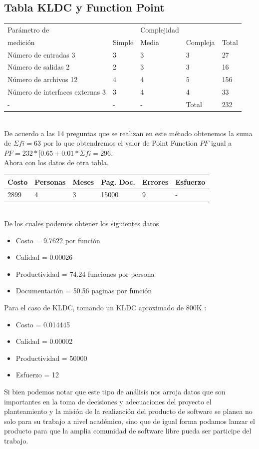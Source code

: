 \documentclass[10pt,executivepaper]{article}
\begin{document}
\subsection{Tabla KLDC y Function Point}
\begin{tabular}{|p{3cm}|p{2cm}|p{2cm}|p{2cm}|p{2cm}|}
\hline
Parámetro de & & Complejidad & & \\
medición & Simple & Media & Compleja & Total \\\hline
Número de entradas 3 & 3 & 3 & 3 & 27\\\hline
Número de salidas 2 & 2 & 3 & 3 & 16 \\\hline
Número de archivos 12 & 4 & 4 & 5 & 156 \\\hline
Número de interfaces externas 3 & 3 & 4 & 4 & 33\\\hline
- & - & - & Total & 232 \\\hline
\end{tabular}
\vspace{0.5cm}\\
De acuerdo a las 14 preguntas que se realizan en este método obtenemos la suma de $\Sigma{fi}=63$ por lo que obtendremos el valor de Point Function $PF$ igual a $PF=232*[0.65+0.01*\Sigma{fi}=296$.\\
Ahora con los datos de otra tabla.\vspace{0.5cm}\\
\begin{tabular}{|p{1.83cm}|p{1.83cm}|p{1.83cm}|p{1.83cm}|p{1.83cm}|p{1.83cm}|}
    \hline
    Costo & Personas & Meses & Pag. Doc. & Errores & Esfuerzo \\\hline
    2899 & 4 & 3 & 15000 & 9 & - \\\hline
\end{tabular}
\vspace{0.5cm}\\
De los cuales podemos obtener los siguientes datos
\begin{itemize}
    \item Costo = 9.7622 por función
    \item Calidad = 0.00026
    \item Productividad = 74.24 funciones por persona
    \item Documentación = 50.56 paginas por función
\end{itemize}
\vspace{0.5cm}
Para el caso de KLDC, tomando un KLDC aproximado de 800K :\vspace{0.5cm}
\begin{itemize}
    \item Costo = 0.014445
    \item Calidad = 0.00002
    \item Productividad = 50000
    \item Esfuerzo = 12
\end{itemize}
\vspace{0.5cm}
Si bien podemos notar que este tipo de análisis nos arroja datos que son importantes en la toma de decisiones y adecuaciones del proyecto el planteamiento y la misión de la realización del producto de software se planea no solo para su trabajo a nivel académico, sino que de igual forma podamos lanzar el producto para que la amplia comunidad de software libre pueda ser participe del trabajo.
\end{document}
